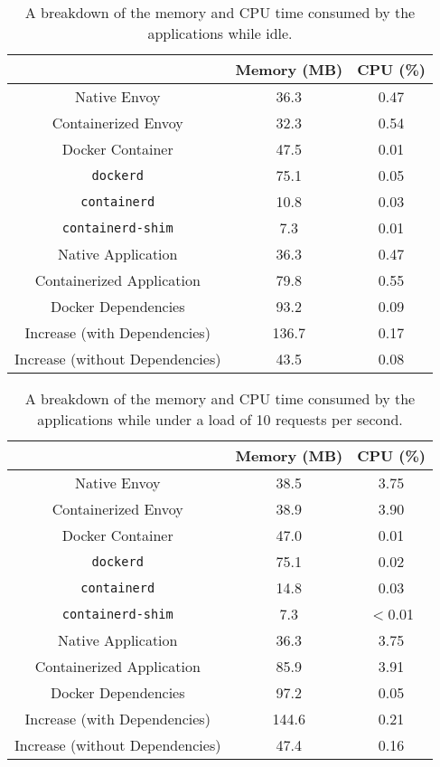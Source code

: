 \documentclass{article}
\begin{document}
\begin{table}[H]
\begin{tabular}{ |c|c|c| }
 \hline
   & Memory (MB) & CPU (\%) \\ 
 \hline
 Native Envoy & 36.3 & 0.47 \\
 \hline
 Containerized Envoy & 32.3 & 0.54 \\
 \hline
 Docker Container & 47.5 & 0.01 \\
 \hline
 \texttt{dockerd} & 75.1 & 0.05 \\
 \hline
 \texttt{containerd} & 10.8 & 0.03 \\
 \hline
 \texttt{containerd-shim} & 7.3 & 0.01 \\
 \hline\hline
 Native Application & 36.3 & 0.47 \\
 \hline
 Containerized Application & 79.8 & 0.55 \\
 \hline
 Docker Dependencies & 93.2 & 0.09 \\
 \hline\hline
 Increase (with Dependencies) & 136.7 & 0.17 \\
 \hline
 Increase (without Dependencies) & 43.5 & 0.08 \\
 \hline
\end{tabular}
\caption{A breakdown of the memory and CPU time consumed by the applications while idle.}
\label{idle-consumption-breakdown}
\end{table}

\begin{table}[H]
\begin{tabular}{ |c|c|c| }
 \hline
   & Memory (MB) & CPU (\%) \\ 
 \hline
 Native Envoy & 38.5 & 3.75 \\
 \hline
 Containerized Envoy & 38.9 & 3.90 \\
 \hline
 Docker Container & 47.0 & 0.01 \\
 \hline
 \texttt{dockerd} & 75.1 & 0.02 \\
 \hline
 \texttt{containerd} & 14.8 & 0.03 \\
 \hline
 \texttt{containerd-shim} & 7.3 & $<$0.01 \\
 \hline\hline
 Native Application & 36.3 & 3.75 \\
 \hline
 Containerized Application & 85.9 & 3.91 \\
 \hline
 Docker Dependencies & 97.2 & 0.05 \\
 \hline\hline
 Increase (with Dependencies) & 144.6 & 0.21 \\
 \hline
 Increase (without Dependencies) & 47.4 & 0.16 \\
 \hline
\end{tabular}
\caption{A breakdown of the memory and CPU time consumed by the applications while under a load of 10 requests per second.}
\label{consumption-breakdown-under-load-10}
\end{table}
\end{document}
